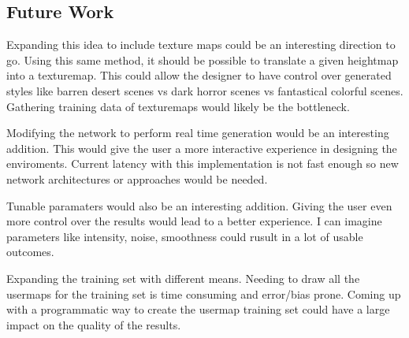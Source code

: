 \documentclass[twocolumn]{article}
\begin{document}
	
	\subsection{Future Work}
	
	Expanding this idea to include texture maps could be an interesting direction to go. Using this same method, it should be possible to translate a given heightmap into a texturemap. This could allow the designer to have control over generated styles like barren desert scenes vs dark horror scenes vs fantastical colorful scenes. Gathering training data of texturemaps would likely be the bottleneck.
	
	Modifying the network to perform real time generation would be an interesting addition. This would give the user a more interactive experience in designing the enviroments. Current latency with this implementation is not fast enough so new network architectures or approaches would be needed.
	
	Tunable paramaters would also be an interesting addition. Giving the user even more control over the results would lead to a better experience. I can imagine parameters like intensity, noise, smoothness could rusult in a lot of usable outcomes.
	
	Expanding the training set with different means. Needing to draw all the usermaps for the training set is time consuming and error/bias prone. Coming up with a programmatic way to create the usermap training set could have a large impact on the quality of the results.

	
		
  
\end{document}
